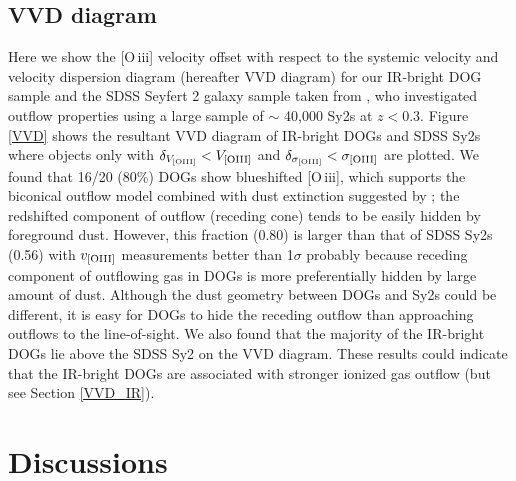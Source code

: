 \documentclass[twocolumn]{aastex6}
\newcommand{\oiii}{[O{\,\sc iii}]\,\,}
\begin{document}
\subsection{VVD diagram}
\label{sVVD}
Here we show the \oiii velocity offset with respect to the systemic velocity and velocity dispersion diagram (hereafter VVD diagram) for our IR-bright DOG sample and the SDSS Seyfert 2 galaxy sample taken from \cite{Woo}, who investigated outflow properties using a large sample of $\sim$ 40,000 Sy2s at $z< 0.3$.
Figure \ref{VVD} shows the resultant VVD diagram of IR-bright DOGs and SDSS Sy2s where objects only with $\delta_{V_{\rm [OIII]}} < V_{\rm [OIII]}$ and $\delta_{\sigma_{\rm [OIII]}} < \sigma_{\rm [OIII]}$ are plotted.
We found that 16/20 (80\%) DOGs show blueshifted [O{\,\sc iii}], which supports the biconical outflow model combined with dust extinction suggested by \cite{Crenshaw} \citep[see also][]{Barrows}; the redshifted component of outflow (receding cone) tends to be easily hidden by foreground dust.
However, this fraction (0.80) is larger than that of SDSS Sy2s (0.56) with $v_{\rm [OIII]}$ measurements better than 1$\sigma$ probably because receding component of outflowing gas in DOGs is more preferentially hidden by large amount of dust. 
Although the dust geometry between DOGs and Sy2s could be different, it is easy for DOGs to hide the receding outflow than approaching outflows to the line-of-sight.
We also found that the majority of the IR-bright DOGs lie above the SDSS Sy2 on the VVD diagram.
These results could indicate that the IR-bright DOGs are associated with stronger ionized gas outflow (but see Section \ref{VVD_IR}). \\


\section{Discussions}
\label{Dis}
\end{document}
